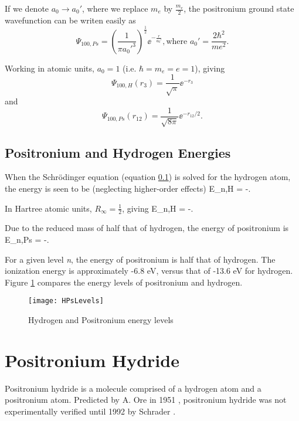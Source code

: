 \documentclass[main.tex]{subfiles}
\begin{document}
If we denote $a_0 \rightarrow a_0'$, where we replace $m_e$ by $\frac{m_e}{2}$, the positronium ground state wavefunction can be writen easily as
\begin{equation}
\Psi_{100,Ps} = \left(\frac{1}{\pi {a_0'}^3}\right)^{\frac{1}{2}} \!\! \ee^{-\frac{r}{a_0'}},
\text{where } a_0' = \frac{2\hbar^2}{m e^2}.
\end{equation}

Working in atomic units, $a_0 = 1$ (i.e. $\hbar = m_e = e = 1$), giving
\begin{equation}
\Psi_{100,H}\left(r_3\right) = \frac{1}{\sqrt{\pi}} \ee^{-r_3}
\label{eq:HWave}
\end{equation}
and
\begin{equation}
\Psi_{100,Ps}\left(r_{12}\right) = \frac{1}{\sqrt{8 \pi}} \ee^{-r_{12}/2}.
\label{eq:PsWave}
\end{equation}

\subsection{Positronium and Hydrogen Energies}

When the Schr\"{o}dinger equation (equation \ref{}) is solved for the hydrogen atom, the energy is seen to be (neglecting higher-order effects)
\beq
\label{eq:HEnergy}
E_{n,H} = -.
\eeq

\noindent In Hartree atomic units, $R_\infty = \frac{1}{2}$, giving
\beq
\label{eq:HEnergyAU}
E_{n,H} = -.
\eeq

\noindent Due to the reduced mass of half that of hydrogen, the energy of positronium is
\beq
\label{eq:PsEnergyAU}
E_{n,Ps} = -.
\eeq

\noindent For a given level \emph{n}, the energy of positronium is half that of hydrogen.  The ionization energy is approximately -6.8 eV, versus that of -13.6 eV for hydrogen.  Figure \ref{fig:HPsLevels} compares the energy levels of positronium and hydrogen.

\begin{figure}[H]
	\centering
	\texttt{[image: HPsLevels]}
	\caption{Hydrogen and Positronium energy levels}
	\label{fig:HPsLevels}
\end{figure}

\section{Positronium Hydride}
\label{sec:PsH}
Positronium hydride is a molecule comprised of a hydrogen atom and a positronium atom.  Predicted by A. Ore in 1951 \cite{Ore1951}, positronium hydride was not experimentally verified until 1992 by Schrader \cite{Schrader1992}.
\end{document}
